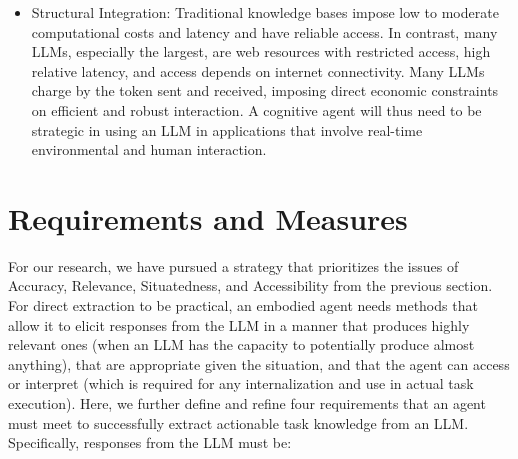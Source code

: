 \documentclass[letterpaper]{article} %
\begin{document}
\begin{itemize}
\item Structural Integration: Traditional knowledge bases impose low to moderate computational costs and latency and have reliable access. In contrast, many LLMs, especially the largest, are web resources with restricted access, high relative latency, and  access depends on internet connectivity. Many LLMs charge by the token sent and received, imposing direct economic constraints on efficient and robust interaction.
A cognitive agent will thus need to be strategic in using an LLM in applications that involve real-time environmental and human interaction.

\end{itemize}


\section{Requirements and Measures}

For our research, we have pursued a strategy that prioritizes the issues of Accuracy, Relevance, Situatedness, and Accessibility from the previous section. For direct extraction to be practical, an embodied agent needs methods that allow it to elicit responses from the LLM in a manner that produces highly relevant ones (when an LLM has the capacity to potentially produce almost anything), that are appropriate given the situation, and that the agent can access or interpret (which is required for any internalization and use in actual task execution). Here, we further define and refine four requirements \cite{kirk_improving_2023} that an agent must meet to successfully extract actionable task knowledge from an LLM. Specifically, responses from the LLM must be:
\end{document}
